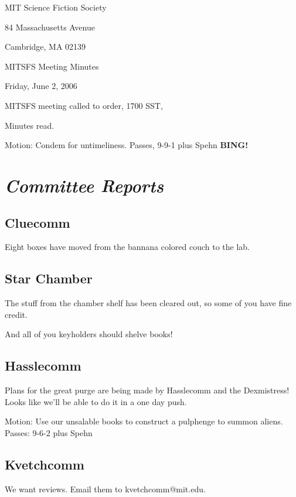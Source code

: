 \documentclass[10pt]{article}
\newcommand{\bing}{{\bf BING!} }
\newcommand{\goto}[1]{\bing \vskip 12pt \section*{{\em{#1}}}}
\newcommand{\ps}{ plus Spehn\xspace}
\begin{document}
\begin{center}

MIT Science Fiction Society

84 Massachusetts Avenue

Cambridge, MA 02139

\vspace{12pt}

MITSFS Meeting Minutes

Friday, June 2, 2006

\end{center}

\vspace{18pt}

\setlength{\parskip}{6pt}

\noindent
MITSFS meeting called to order, 1700 SST,

Minutes read.

Motion:  Condem for untimeliness.  Passes, 9-9-1\ps
\goto{Committee Reports}

\subsection*{Cluecomm}

Eight boxes have moved from the bannana colored couch to the lab.

\subsection*{Star Chamber}

The stuff from the chamber shelf has been cleared out, so some of you have fine credit.

And all of you keyholders should shelve books!

\subsection*{Hasslecomm}

Plans for the great purge are being made by Hasslecomm and the Dexmistress!  Looks like we'll be able to do it in a one day push.

Motion:  Use our unsalable books to construct a pulphenge to summon aliens. Passes:  9-6-2\ps

\subsection*{Kvetchcomm}

We want reviews.  Email them to kvetchcomm@mit.edu.
\end{document}
